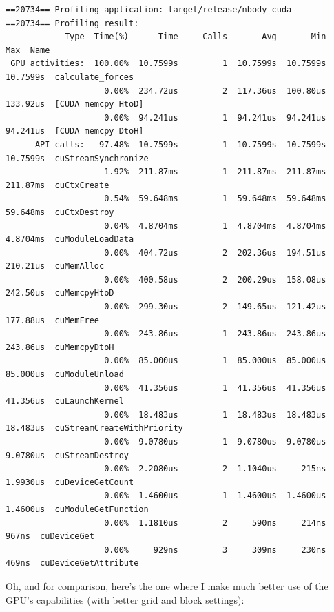\documentclass[a4paper]{report}
\begin{document}
{\scriptsize
\begin{verbatim}
==20734== Profiling application: target/release/nbody-cuda
==20734== Profiling result:
            Type  Time(%)      Time     Calls       Avg       Min       Max  Name
 GPU activities:  100.00%  10.7599s         1  10.7599s  10.7599s  10.7599s  calculate_forces
                    0.00%  234.72us         2  117.36us  100.80us  133.92us  [CUDA memcpy HtoD]
                    0.00%  94.241us         1  94.241us  94.241us  94.241us  [CUDA memcpy DtoH]
      API calls:   97.48%  10.7599s         1  10.7599s  10.7599s  10.7599s  cuStreamSynchronize
                    1.92%  211.87ms         1  211.87ms  211.87ms  211.87ms  cuCtxCreate
                    0.54%  59.648ms         1  59.648ms  59.648ms  59.648ms  cuCtxDestroy
                    0.04%  4.8704ms         1  4.8704ms  4.8704ms  4.8704ms  cuModuleLoadData
                    0.00%  404.72us         2  202.36us  194.51us  210.21us  cuMemAlloc
                    0.00%  400.58us         2  200.29us  158.08us  242.50us  cuMemcpyHtoD
                    0.00%  299.30us         2  149.65us  121.42us  177.88us  cuMemFree
                    0.00%  243.86us         1  243.86us  243.86us  243.86us  cuMemcpyDtoH
                    0.00%  85.000us         1  85.000us  85.000us  85.000us  cuModuleUnload
                    0.00%  41.356us         1  41.356us  41.356us  41.356us  cuLaunchKernel
                    0.00%  18.483us         1  18.483us  18.483us  18.483us  cuStreamCreateWithPriority
                    0.00%  9.0780us         1  9.0780us  9.0780us  9.0780us  cuStreamDestroy
                    0.00%  2.2080us         2  1.1040us     215ns  1.9930us  cuDeviceGetCount
                    0.00%  1.4600us         1  1.4600us  1.4600us  1.4600us  cuModuleGetFunction
                    0.00%  1.1810us         2     590ns     214ns     967ns  cuDeviceGet
                    0.00%     929ns         3     309ns     230ns     469ns  cuDeviceGetAttribute
\end{verbatim}
}

Oh, and for comparison, here's the one where I make much better use of the GPU's capabilities (with better grid and block settings):
\end{document}
